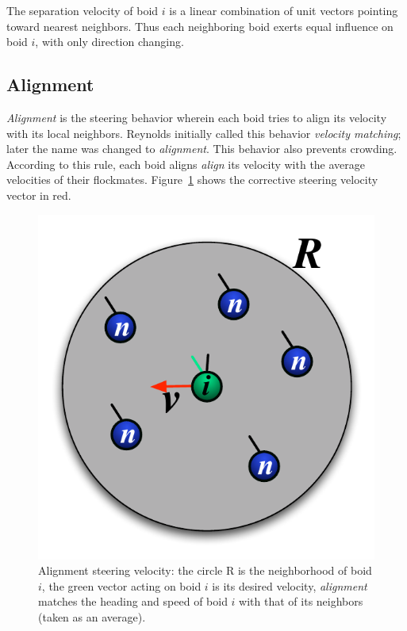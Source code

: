 The separation velocity of boid $i$ is a linear combination of unit vectors pointing toward nearest neighbors. Thus each neighboring boid exerts equal influence on boid $i$, with only direction changing. 

\subsection{Alignment}
\textit{Alignment} is the steering behavior wherein each boid tries to align its velocity with its local neighbors. Reynolds initially called this behavior \textit{velocity matching}; later the name was changed to \textit{alignment}. This behavior also prevents crowding. According to this rule, each boid aligns \textit{align} its velocity with the average velocities of their flockmates. Figure~\ref{alignmentPDF} shows the corrective steering velocity vector in red.

\begin{figure}[htbp]
\begin{center}
\includegraphics[scale=0.85]{figures/alignment.pdf}
\caption{Alignment steering velocity: the circle R is the neighborhood of boid $i$, the green vector acting on boid $i$ is its desired velocity, \textit{alignment} matches the heading and speed of boid $i$ with that of its neighbors (taken as an average).}
\label{alignmentPDF}
\end{center}
\end{figure}


